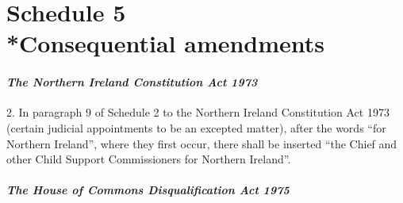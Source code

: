 \documentclass[12pt,a4paper]{article}
\begin{document}
\part[Schedule 5 --- Consequential amendments]{Schedule 5\\*Consequential amendments}

\renewcommand\parthead{--- Schedule 5}


%
%
%
%

\subsection*{\itshape The Northern Ireland Constitution Act 1973}

2. In paragraph 9 of Schedule 2 to the Northern Ireland Constitution Act 1973 (certain judicial appointments to be an excepted matter), after the words “for Northern Ireland”, where they first occur, there shall be inserted “the Chief and other Child Support Commissioners for Northern Ireland”.

\subsection*{\itshape The House of Commons Disqualification Act 1975}
\end{document}
